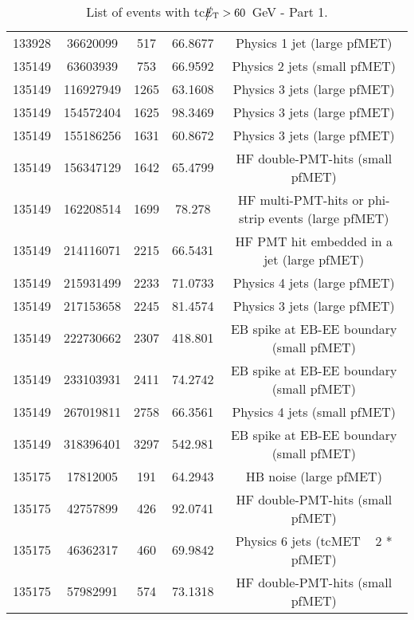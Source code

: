 \begin{table}[htbp]
\begin{center}
\begin{tabular}{|c|c|c|c|c|}
      133928 & 36620099    & 517  &    66.8677  & Physics 1 jet (large pfMET) \\
      135149 & 63603939    & 753  &    66.9592  & Physics 2 jets (small pfMET) \\
      135149 & 116927949   & 1265 &    63.1608  & Physics 3 jets (large pfMET) \\
      135149 & 154572404   & 1625 &    98.3469  & Physics 3 jets (large pfMET) \\
      135149 & 155186256   & 1631 &    60.8672  & Physics 3 jets (large pfMET) \\
      135149 & 156347129   & 1642 &    65.4799  & HF double-PMT-hits (small pfMET) \\
      135149 & 162208514   & 1699 &    78.278   & HF multi-PMT-hits or phi-strip events (large pfMET) \\ 
      135149 & 214116071   & 2215 &    66.5431  & HF PMT hit embedded in a jet (large pfMET) \\
      135149 & 215931499   & 2233 &    71.0733  & Physics 4 jets (large pfMET) \\
      135149 & 217153658   & 2245 &    81.4574  & Physics 3 jets (large pfMET) \\
      135149 & 222730662   & 2307 &    418.801  & EB spike at EB-EE boundary (small pfMET) \\ 
      135149 & 233103931   & 2411 &    74.2742  & EB spike at EB-EE boundary (small pfMET) \\ 
      135149 & 267019811   & 2758 &    66.3561  & Physics 4 jets (small pfMET) \\
      135149 & 318396401   & 3297 &    542.981  & EB spike at EB-EE boundary (small pfMET) \\
      135175  & 17812005     & 191  &    64.2943 & HB noise (large pfMET) \\
      135175  & 42757899     & 426  &    92.0741 & HF double-PMT-hits (small pfMET) \\
      135175  & 46362317     & 460  &    69.9842 & Physics 6 jets (tcMET ~ 2 * pfMET) \\
      135175  & 57982991     & 574  &    73.1318 & HF double-PMT-hits (small pfMET) \\
      \hline
    \end{tabular}
    \caption{List of events with tc$\big\slash\hspace{-1.6ex}{E_\text{T}}>60$~GeV - Part 1.}        
    \label{tab:tcMETlist1}
  \end{center}
\end{table}


